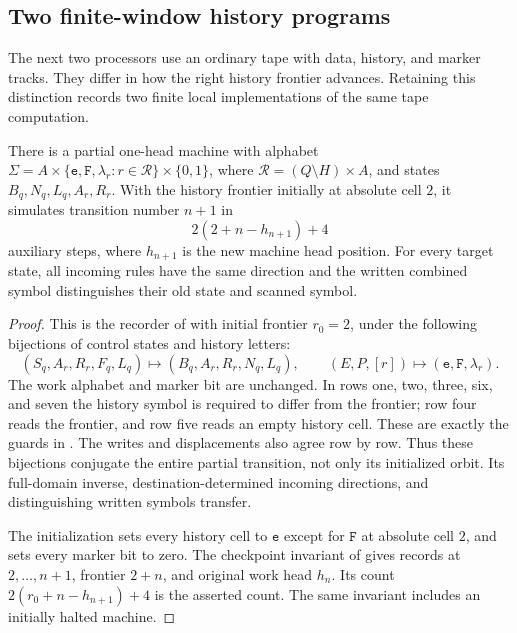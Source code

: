 \subsection{Two finite-window history programs}
\label{subsec:sb-frontier}
The next two processors use an ordinary tape with data, history, and marker tracks.  They differ in how the right history frontier advances.  Retaining this distinction records two finite local implementations of the same tape computation.

\begin{lemma}\label{lem:sb-frontier}\label{lem:p2:rapid-history}
There is a partial one-head machine with alphabet
$\Sigma=A\times\{\mathtt e,\mathtt F,\lambda_r:r\in\mathcal R\}\times\{0,1\}$,
where $\mathcal R=(Q\setminus H)\times A$, and states
$B_q,N_q,L_q,A_r,R_r$.  With the history frontier initially at absolute cell $2$, it simulates transition number $n+1$ in
\[
 2(2+n-h_{n+1})+4
\]
auxiliary steps, where $h_{n+1}$ is the new machine head position.  For every target state, all incoming rules have the same direction and the written combined symbol distinguishes their old state and scanned symbol.
\end{lemma}
\begin{proof}
This is the recorder of \cite[Lemma~2.1]{OpenAIShear2026} with initial frontier
$r_0=2$, under the following bijections of control states and history
letters:
\[
 (S_q,A_r,R_r,F_q,L_q)\mapsto(B_q,A_r,R_r,N_q,L_q),\qquad
 (E,P,[r])\mapsto(\mathtt e,\mathtt F,\lambda_r).
\]
The work alphabet and marker bit are unchanged. In rows one, two, three,
six, and seven the history symbol is required to differ from the
frontier; row four reads the frontier, and row five reads an empty
history cell. These are exactly the guards in \cite[Lemma~2.1]{OpenAIShear2026}.
The writes and displacements also agree row by row. Thus these
bijections conjugate the entire partial transition, not only its
initialized orbit. Its full-domain inverse, destination-determined
incoming directions, and distinguishing written symbols transfer.

The initialization sets every history cell to $\mathtt e$ except
for $\mathtt F$ at absolute cell $2$, and sets every marker bit to
zero. The checkpoint invariant of \cite[Lemma~2.1]{OpenAIShear2026} gives records
at $2,\ldots,n+1$, frontier $2+n$, and original work head $h_n$.
Its count $2(r_0+n-h_{n+1})+4$ is the asserted count. The same invariant
includes an initially halted machine.
\end{proof}

